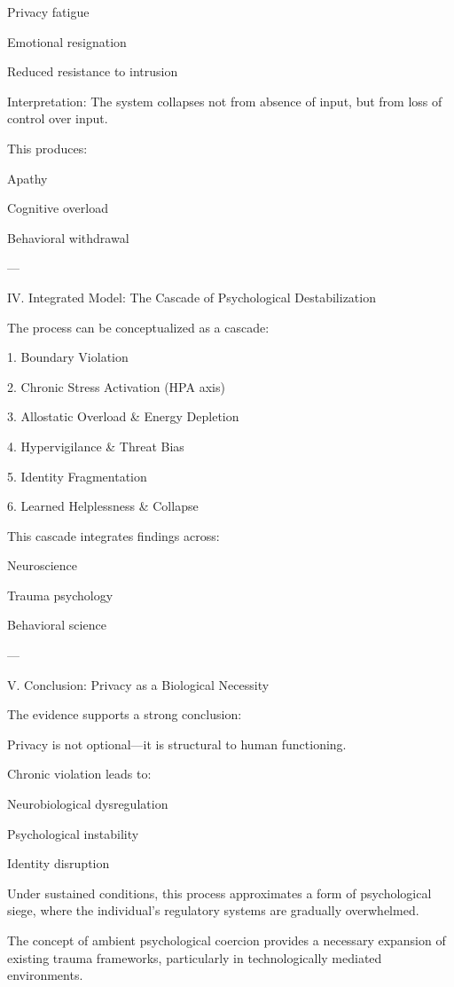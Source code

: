 Privacy fatigue

Emotional resignation

Reduced resistance to intrusion


Interpretation:
The system collapses not from absence of input, but from loss of control over input.

This produces:

Apathy

Cognitive overload

Behavioral withdrawal



---

IV. Integrated Model: The Cascade of Psychological Destabilization

The process can be conceptualized as a cascade:

1. Boundary Violation


2. Chronic Stress Activation (HPA axis)


3. Allostatic Overload & Energy Depletion


4. Hypervigilance & Threat Bias


5. Identity Fragmentation


6. Learned Helplessness & Collapse



This cascade integrates findings across:

Neuroscience

Trauma psychology

Behavioral science



---

V. Conclusion: Privacy as a Biological Necessity

The evidence supports a strong conclusion:

Privacy is not optional—it is structural to human functioning.

Chronic violation leads to:

Neurobiological dysregulation

Psychological instability

Identity disruption


Under sustained conditions, this process approximates a form of psychological siege, where the individual’s regulatory systems are gradually overwhelmed.

The concept of ambient psychological coercion provides a necessary expansion of existing trauma frameworks, particularly in technologically mediated environments.


